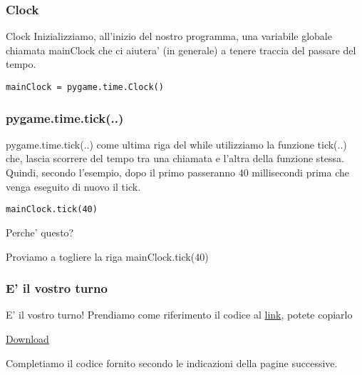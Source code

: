 \documentclass{beamer}
\begin{document}
\begin{frame}[fragile]
\frametitle{Clock}

\begin{block}{Clock}
Inizializziamo, all'inizio del nostro programma, una variabile globale chiamata mainClock che ci aiutera' (in generale) a tenere traccia del passare del tempo.
\end{block}

\begin{lstlisting}
mainClock = pygame.time.Clock()
\end{lstlisting}
\end{frame}

\begin{frame}[fragile]
\frametitle{pygame.time.tick(..)}

\begin{block}{pygame.time.tick(..)}
come ultima riga del while utilizziamo la funzione tick(..) che, lascia scorrere del tempo tra una chiamata e l'altra della funzione stessa. Quindi, secondo l'esempio, dopo il primo passeranno 40 millisecondi prima che venga eseguito di nuovo il tick.
\end{block}

\begin{lstlisting}
mainClock.tick(40)
\end{lstlisting}

\begin{block}{}
Perche' questo?

Proviamo a togliere la riga mainClock.tick(40)
\end{block}

\end{frame}

\begin{frame}[fragile]
\frametitle{E' il vostro turno}

\begin{block}{E' il vostro turno!}
Prendiamo come riferimento il codice al \href{https://raw.githubusercontent.com/ragazzedigitalicesena/slide-2019/master/tex/chapter_19-20/collisionDetection.py}{link}, potete copiarlo

\href{https://raw.githubusercontent.com/ragazzedigitalicesena/slide-2019/master/tex/chapter_19-20/collisionDetection.py}{Download}

\vspace{5mm}
Completiamo il codice fornito secondo le indicazioni della pagine successive.
\end{block}

\end{frame}
\end{document}
